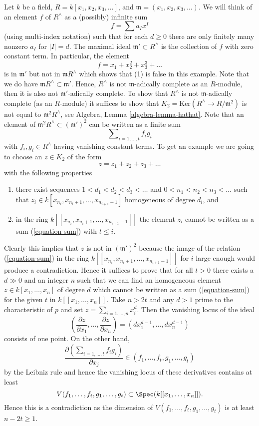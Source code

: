 \medskip\noindent
Let $k$ be a field, $R = k[x_1, x_2, x_3, \ldots]$, and
$\mathfrak m = (x_1, x_2, x_3, \ldots)$.
We will think of an element $f$ of $R^\wedge$ as a (possibly) infinite sum
$$
f = \sum a_I x^I
$$
(using multi-index notation) such that for each $d \geq 0$ there
are only finitely many nonzero $a_I$ for $|I| = d$. The maximal
ideal $\mathfrak m' \subset R^\wedge$ is the collection of $f$ with
zero constant term. In particular, the element
$$
f = x_1 + x_2^2 + x_3^3 + \ldots
$$
is in $\mathfrak m'$ but not in $\mathfrak m R^\wedge$ which
shows that (1) is false in this example. Note that we do have
$\mathfrak m R^\wedge \subset \mathfrak m'$. Hence, $R^\wedge$
is not $\mathfrak m$-adically complete as an $R$-module, then it is also not
$\mathfrak m'$-adically complete. To show that $R^\wedge$ is not
$\mathfrak m$-adically complete (as an $R$-module)
it suffices to show that $K_2 = \text{Ker}(R^\wedge \to R/\mathfrak m^2)$
is not equal to $\mathfrak m^2R^\wedge$, see
Algebra, Lemma \ref{algebra-lemma-hathat}.
Note that an element of $\mathfrak m^2R^\wedge \subset (\mathfrak m')^2$
can be written as a finite sum
\begin{equation}
\label{equation-sum}
\sum\nolimits_{i = 1, \ldots, t} f_i g_i
\end{equation}
with $f_i, g_i \in R^\wedge$ having vanishing constant terms.
To get an example we are going to choose an $z \in K_2$
of the form
$$
z = z_1 + z_2 + z_3 + \ldots
$$
with the following properties
\begin{enumerate}
\item there exist sequences $1 < d_1 < d_2 < d_3 < \ldots $ and
$0 < n_1 < n_2 < n_3 < \ldots$ such that
$z_i \in k[x_{n_i}, x_{n_i + 1}, \ldots, x_{n_{i + 1} - 1}]$
homogeneous of degree $d_i$, and
\item in the ring $k[[x_{n_i}, x_{n_i + 1}, \ldots, x_{n_{i + 1} - 1}]]$
the element $z_i$ cannot be written as a sum (\ref{equation-sum})
with $t \leq i$.
\end{enumerate}
Clearly this implies that $z$ is not in $(\mathfrak m')^2$
because the image of the relation (\ref{equation-sum}) in the
ring $k[[x_{n_i}, x_{n_i + 1}, \ldots, x_{n_{i + 1} - 1}]]$
for $i$ large enough would produce a contradiction. Hence it suffices
to prove that for all $t > 0$ there exists a $d \gg 0$ and an integer
$n$ such that we can find an homogeneous element
$z \in k[x_1, \ldots, x_n]$ of degree $d$ which cannot be written as
a sum (\ref{equation-sum}) for the given $t$ in $k[[x_1, \ldots, x_n]]$.
Take $n > 2t$ and any $d > 1$ prime to the characteristic of $p$ and
set $z = \sum_{i = 1, \ldots, n} x_i^d$. Then the vanishing locus
of the ideal
$$
(\frac{\partial z}{\partial x_1}, \ldots, \frac{\partial z}{\partial x_n})
=
(dx_1^{d - 1}, \ldots, dx_n^{d - 1})
$$
consists of one point. On the other hand,
$$
\frac{\partial ( \sum\nolimits_{i = 1, \ldots, t} f_i g_i ) }{\partial x_j}
\in (f_1, \ldots, f_t, g_1, \ldots, g_t)
$$
by the Leibniz rule and hence the vanishing locus of these derivatives
contains at least
$$
V(f_1, \ldots, f_t, g_1, \ldots, g_t) \subset
\Spec(k[[x_1, \ldots, x_n]]).
$$
Hence this is a contradiction as the dimension of
$V(f_1, \ldots, f_t, g_1, \ldots, g_t)$ is at least $n - 2t \geq 1$.

